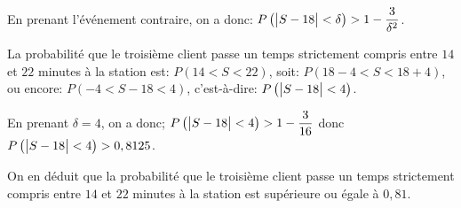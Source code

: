 \begin{enumerate}
En prenant l'événement contraire, on a donc:
$P\left ( \left |S-18\strut \right | < \delta \right ) > 1- \dfrac{3}{\delta^2}$.

La probabilité que le troisième client passe un temps strictement compris entre $14$ et $22$ minutes à la station est:
$P(14<S<22)$, soit: $P(18-4<S<18+4)$, ou encore: $P(-4<S-18<4)$, c'est-à-dire:
$P\left ( \left | S-18 \strut \right | <4\right )$.

En prenant $\delta=4$, on a donc;
$P\left ( \left |S-18\strut \right | < 4 \right ) >1- \dfrac{3}{16}$
donc $P\left ( \left |S-18\strut \right | < 4 \right ) > 0,8125$.

On en déduit que la probabilité que le troisième client passe un temps strictement compris entre $14$ et $22$ minutes à la station est supérieure ou égale à $0,81$.
\end{enumerate}

\bigskip
